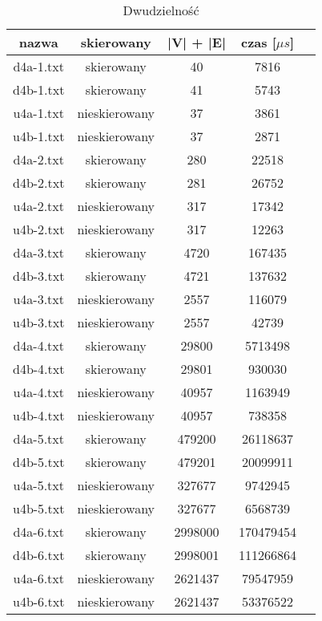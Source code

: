 \documentclass[12pt, letterpaper]{article}
\begin{document}
\begin{table}[H]\centering
    \caption{Dwudzielność}
    \begin{tabular}{|c|c|c|c|c|}\hline
        nazwa     & skierowany    & |V| + |E| & czas [$\mu s$] \\\hline
        d4a-1.txt & skierowany    & 40        & 7816      \\\hline
        d4b-1.txt & skierowany    & 41        & 5743      \\\hline
        u4a-1.txt & nieskierowany & 37        & 3861      \\\hline
        u4b-1.txt & nieskierowany & 37        & 2871      \\\hline
        d4a-2.txt & skierowany    & 280       & 22518     \\\hline
        d4b-2.txt & skierowany    & 281       & 26752     \\\hline
        u4a-2.txt & nieskierowany & 317       & 17342     \\\hline
        u4b-2.txt & nieskierowany & 317       & 12263     \\\hline
        d4a-3.txt & skierowany    & 4720      & 167435    \\\hline
        d4b-3.txt & skierowany    & 4721      & 137632    \\\hline
        u4a-3.txt & nieskierowany & 2557      & 116079    \\\hline
        u4b-3.txt & nieskierowany & 2557      & 42739     \\\hline
        d4a-4.txt & skierowany    & 29800     & 5713498   \\\hline
        d4b-4.txt & skierowany    & 29801     & 930030    \\\hline
        u4a-4.txt & nieskierowany & 40957     & 1163949   \\\hline
        u4b-4.txt & nieskierowany & 40957     & 738358    \\\hline
        d4a-5.txt & skierowany    & 479200    & 26118637  \\\hline
        d4b-5.txt & skierowany    & 479201    & 20099911  \\\hline
        u4a-5.txt & nieskierowany & 327677    & 9742945   \\\hline
        u4b-5.txt & nieskierowany & 327677    & 6568739   \\\hline
        d4a-6.txt & skierowany    & 2998000   & 170479454 \\\hline
        d4b-6.txt & skierowany    & 2998001   & 111266864 \\\hline
        u4a-6.txt & nieskierowany & 2621437   & 79547959  \\\hline
        u4b-6.txt & nieskierowany & 2621437   & 53376522  \\\hline
    \end{tabular}
\end{table}
\end{document}

